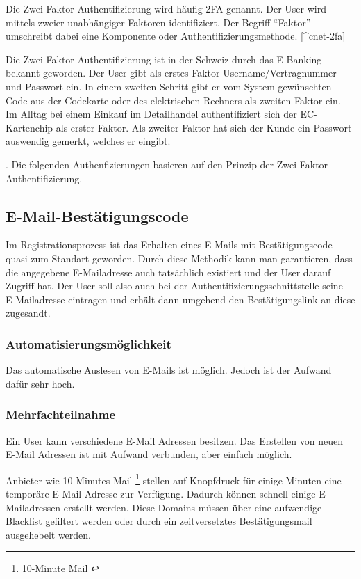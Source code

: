 Die Zwei-Faktor-Authentifizierung wird häufig 2FA genannt. Der User wird
mittels zweier unabhängiger Faktoren identifiziert. Der Begriff
``Faktor'' umschreibt dabei eine Komponente oder
Authentifizierungsmethode. {[}\^{}cnet-2fa{]}

Die Zwei-Faktor-Authentifizierung ist in der Schweiz durch das E-Banking
bekannt geworden. Der User gibt als erstes Faktor Username/Vertragnummer
und Passwort ein. In einem zweiten Schritt gibt er vom System
gewünschten Code aus der Codekarte oder des elektrischen Rechners als
zweiten Faktor ein. Im Alltag bei einem Einkauf im Detailhandel
authentifiziert sich der EC-Kartenchip als erster Faktor. Als zweiter
Faktor hat sich der Kunde ein Passwort auswendig gemerkt, welches er
eingibt.

. Die folgenden Authenfizierungen basieren auf den Prinzip der
Zwei-Faktor-Authentifizierung.

\subsection{E-Mail-Bestätigungscode}\label{e-mail-bestuxe4tigungscode}

Im Registrationsprozess ist das Erhalten eines E-Mails mit
Bestätigungscode quasi zum Standart geworden. Durch diese Methodik kann
man garantieren, dass die angegebene E-Mailadresse auch tatsächlich
existiert und der User darauf Zugriff hat. Der User soll also auch bei
der Authentifizierungsschnittstelle seine E-Mailadresse eintragen und
erhält dann umgehend den Bestätigungslink an diese zugesandt.

\subsubsection{Automatisierungsmöglichkeit}\label{automatisierungsmuxf6glichkeit-2}

Das automatische Auslesen von E-Mails ist möglich. Jedoch ist der
Aufwand dafür sehr hoch.

\subsubsection{Mehrfachteilnahme}\label{mehrfachteilnahme-2}

Ein User kann verschiedene E-Mail Adressen besitzen. Das Erstellen von
neuen E-Mail Adressen ist mit Aufwand verbunden, aber einfach möglich.

Anbieter wie 10-Minutes Mail \footnote{10-Minute Mail
  \autocite{10minutemail}} stellen auf Knopfdruck für einige Minuten
eine temporäre E-Mail Adresse zur Verfügung. Dadurch können schnell
einige E-Mailadressen erstellt werden. Diese Domains müssen über eine
aufwendige Blacklist gefiltert werden oder durch ein zeitversetztes
Bestätigungsmail ausgehebelt werden.

